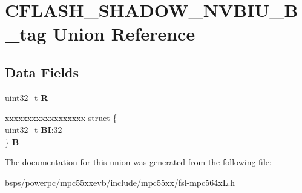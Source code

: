 \hypertarget{unionCFLASH__SHADOW__NVBIU__32B__tag}{}\section{C\+F\+L\+A\+S\+H\+\_\+\+S\+H\+A\+D\+O\+W\+\_\+\+N\+V\+B\+I\+U\+\_\+B\+\_\+tag Union Reference}
\label{unionCFLASH__SHADOW__NVBIU__32B__tag}
\subsection*{Data Fields}
\begin{DoxyCompactItemize}
\item 
\mbox{\label{unionCFLASH__SHADOW__NVBIU__32B__tag_a27f7ae9d5e765661c07ad57738e90591}} 
uint32\+\_\+t {\bfseries R}
\item 
\mbox{\label{unionCFLASH__SHADOW__NVBIU__32B__tag_aeae01e86d804f915e76f6c29d85f2d08}} 
\begin{tabbing}
xx\=xx\=xx\=xx\=xx\=xx\=xx\=xx\=xx\=\kill
struct \{\\
\>uint32\_t {\bfseries BI}:32\\
\} {\bfseries B}\\

\end{tabbing}\end{DoxyCompactItemize}


The documentation for this union was generated from the following file\+:\begin{DoxyCompactItemize}
\item 
bsps/powerpc/mpc55xxevb/include/mpc55xx/fsl-\/mpc564x\+L.\+h\end{DoxyCompactItemize}
